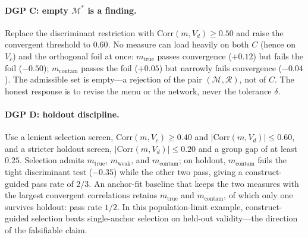 \documentclass[10pt,letterpaper]{article}
\newcommand{\M}{\ensuremath{\mathcal{M}}}
\newcommand{\Rset}{\mathcal{R}}
\begin{document}
\paragraph{DGP C: empty $\M^*$ is a finding.}
Replace the discriminant restriction with $\mathrm{Corr}(m,V_d)\ge 0.50$ and raise the convergent threshold to $0.60$.
No measure can load heavily on both $C$ (hence on $V_c$) and the orthogonal foil at once: $m_{\mathrm{true}}$ passes convergence ($+0.12$) but fails the foil ($-0.50$); $m_{\mathrm{contam}}$ passes the foil ($+0.05$) but narrowly fails convergence ($-0.04$).
The admissible set is empty---a rejection of the pair $(\M,\Rset)$, not of $C$.
The honest response is to revise the menu or the network, never the tolerance $\delta$.

\paragraph{DGP D: holdout discipline.}
Use a lenient selection screen, $\mathrm{Corr}(m,V_c)\ge 0.40$ and $|\mathrm{Corr}(m,V_d)|\le 0.60$, and a stricter holdout screen, $|\mathrm{Corr}(m,V_d)|\le 0.20$ and a group gap of at least $0.25$.
Selection admits $m_{\mathrm{true}}$, $m_{\mathrm{weak}}$, and $m_{\mathrm{contam}}$; on holdout, $m_{\mathrm{contam}}$ fails the tight discriminant test ($-0.35$) while the other two pass, giving a construct-guided pass rate of $2/3$.
An anchor-fit baseline that keeps the two measures with the largest convergent correlations retains $m_{\mathrm{true}}$ and $m_{\mathrm{contam}}$, of which only one survives holdout: pass rate $1/2$.
In this population-limit example, construct-guided selection beats single-anchor selection on held-out validity---the direction of the falsifiable claim.
\end{document}

